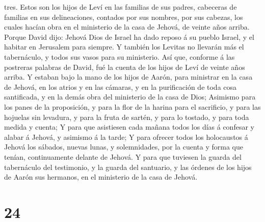 tres.  Estos son los hijos de Leví en las familias de sus
padres, cabeceras de familias en sus delineaciones, contados por sus
nombres, por sus cabezas, los cuales hacían obra en el ministerio de la
casa de Jehová, de veinte años arriba.  Porque David dijo:
Jehová Dios de Israel ha dado reposo á su pueblo Israel, y el habitar en
Jerusalem para siempre.  Y también los Levitas no llevarán
más el tabernáculo, y todos sus vasos para su ministerio. 
Así que, conforme á las postreras palabras de David, fué la cuenta de
los hijos de Leví de veinte años arriba.  Y estaban bajo la
mano de los hijos de Aarón, para ministrar en la casa de Jehová, en los
atrios y en las cámaras, y en la purificación de toda cosa santificada,
y en la demás obra del ministerio de la casa de Dios; 
Asimismo para los panes de la proposición, y para la flor de la harina
para el sacrificio, y para las hojuelas sin levadura, y para la fruta de
sartén, y para lo tostado, y para toda medida y cuenta;  Y
para que asistiesen cada mañana todos los días á confesar y alabar á
Jehová, y asimismo á la tarde;  Y para ofrecer todos los
holocaustos á Jehová los sábados, nuevas lunas, y solemnidades, por la
cuenta y forma que tenían, continuamente delante de Jehová.
 Y para que tuviesen la guarda del tabernáculo del
testimonio, y la guarda del santuario, y las órdenes de los hijos de
Aarón sus hermanos, en el ministerio de la casa de Jehová.

\hypertarget{section-23}{%
\section{24}\label{section-23}}

